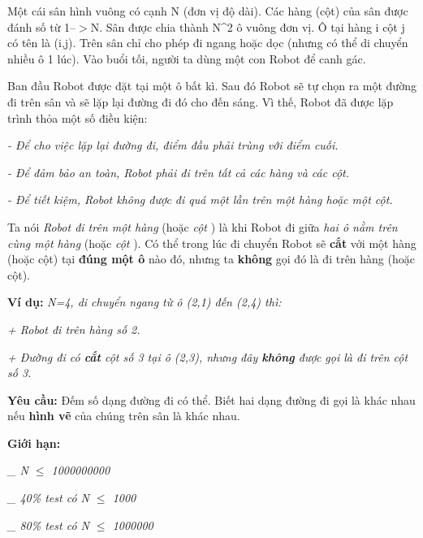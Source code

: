 Một cái sân hình vuông có cạnh N (đơn vị độ dài). Các hàng (cột) của sân được đánh số từ 1--$>$N. Sân được chia thành N^2 ô vuông đơn vị. Ô tại hàng i cột j có tên là (i,j). Trên sân chỉ cho phép đi ngang hoặc dọc (nhưng có thể di chuyển nhiều ô 1 lúc). Vào buổi tối, người ta dùng một con Robot để canh gác.  

   Ban đầu Robot được đặt tại một ô bất kì. Sau đó Robot sẽ tự chọn ra một đường đi trên sân và sẽ lặp lại đường đi đó cho đến sáng. Vì thế, Robot đã được lặp trình thỏa một số điều kiện:  

\emph{    - Để cho việc lặp lại đường đi, điểm đầu phải trùng với điểm cuối.   }

\emph{    - Để đảm bảo an toàn, Robot phải đi trên tất cả các hàng và các cột.    
\\}

\emph{    - Để tiết kiệm, Robot không được đi quá một lần trên một hàng hoặc một cột.   }

   Ta nói   \emph{    Robot đi trên một hàng   }   (hoặc   \emph{    cột   }   ) là khi Robot đi giữa   \emph{    hai ô nằm trên cùng một hàng   }   (hoặc   \emph{    cột   }   ). Có thể trong lúc đi chuyển Robot sẽ   \textbf{    cắt   }   với một hàng (hoặc cột) tại   \textbf{    đúng một ô   }   nào đó, nhưng ta   \textbf{    không   }   gọi đó là đi trên hàng (hoặc cột).  

\textbf{     Ví dụ:    }\emph{    N=4, di chuyển ngang từ ô (2,1) đến (2,4) thì:   }

\emph{    + Robot đi trên hàng số 2.   }

\emph{    + Đường đi có    \textbf{     cắt    }    cột số 3 tại ô (2,3), nhưng đây    \textbf{     không    }    được gọi là đi trên cột số 3.   }

\textbf{      Yêu cầu:     }   Đếm số dạng đường đi có thể. Biết hai dạng đường đi gọi là khác nhau nếu   \textbf{    hình vẽ   }   của chúng trên sân là khác nhau.  

\textbf{      Giới hạn:     }

\emph{    \_ N $\le$ 1000000000   }

\emph{    \_ 40\% test có N $\le$ 1000   }

\emph{    \_ 80\% test có N $\le$ 1000000   }

\